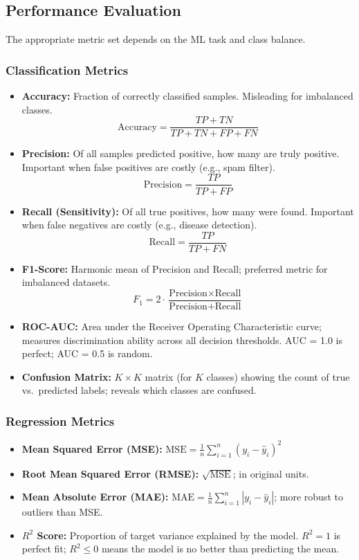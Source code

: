 \documentclass[12pt,a4paper]{article}
\begin{document}
\subsection{Performance Evaluation}

The appropriate metric set depends on the ML task and class balance.

\subsubsection*{Classification Metrics}
\begin{itemize}[noitemsep]
  \item \textbf{Accuracy:} Fraction of correctly classified samples.
        Misleading for imbalanced classes.
        \[
          \text{Accuracy} = \frac{TP + TN}{TP + TN + FP + FN}
        \]
  \item \textbf{Precision:} Of all samples predicted positive, how many are truly positive.
        Important when false positives are costly (e.g., spam filter).
        \[
          \text{Precision} = \frac{TP}{TP + FP}
        \]
  \item \textbf{Recall (Sensitivity):} Of all true positives, how many were found.
        Important when false negatives are costly (e.g., disease detection).
        \[
          \text{Recall} = \frac{TP}{TP + FN}
        \]
  \item \textbf{F1-Score:} Harmonic mean of Precision and Recall; preferred metric
        for imbalanced datasets.
        \[
          F_1 = 2 \cdot \frac{\text{Precision} \times \text{Recall}}{\text{Precision} + \text{Recall}}
        \]
  \item \textbf{ROC-AUC:} Area under the Receiver Operating Characteristic curve;
        measures discrimination ability across all decision thresholds.
        AUC = 1.0 is perfect; AUC = 0.5 is random.
  \item \textbf{Confusion Matrix:} $K \times K$ matrix (for $K$ classes) showing the
        count of true vs.\ predicted labels; reveals which classes are confused.
\end{itemize}

\subsubsection*{Regression Metrics}
\begin{itemize}[noitemsep]
  \item \textbf{Mean Squared Error (MSE):}
        $\displaystyle \text{MSE} = \frac{1}{n}\sum_{i=1}^{n}(y_i - \hat{y}_i)^2$
  \item \textbf{Root Mean Squared Error (RMSE):} $\sqrt{\text{MSE}}$; in original units.
  \item \textbf{Mean Absolute Error (MAE):}
        $\displaystyle \text{MAE} = \frac{1}{n}\sum_{i=1}^{n}|y_i - \hat{y}_i|$;
        more robust to outliers than MSE.
  \item \textbf{$R^2$ Score:} Proportion of target variance explained by the model.
        $R^2 = 1$ is perfect fit; $R^2 \leq 0$ means the model is no better than predicting
        the mean.
\end{itemize}
\end{document}
